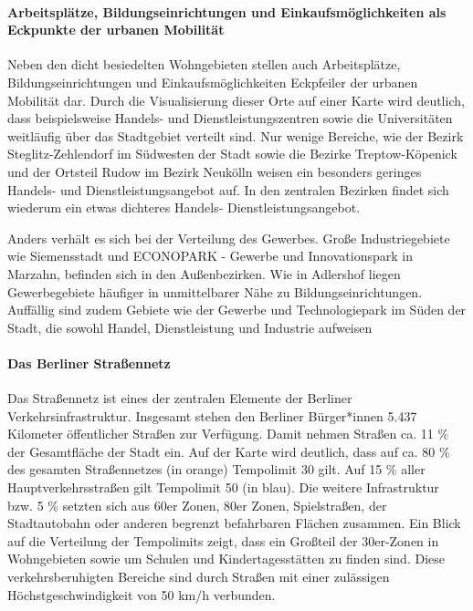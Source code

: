 \paragraph{Arbeitsplätze, Bildungseinrichtungen und Einkaufsmöglichkeiten als Eckpunkte der urbanen Mobilität}

Neben den dicht besiedelten Wohngebieten stellen auch Arbeitsplätze, Bildungseinrichtungen und Einkaufsmöglichkeiten Eckpfeiler der urbanen Mobilität dar. Durch die Visualisierung dieser Orte auf einer Karte wird deutlich, dass beispielsweise Handels- und Dienstleistungszentren sowie die Universitäten weitläufig über das Stadtgebiet verteilt sind. Nur wenige Bereiche, wie der Bezirk Steglitz-Zehlendorf im Südwesten der Stadt sowie die Bezirke Treptow-Köpenick und der Ortsteil Rudow im Bezirk Neukölln weisen ein besonders geringes Handels- und Dienstleistungsangebot auf. In den zentralen Bezirken findet sich wiederum ein etwas dichteres Handels- Dienstleistungsangebot.

Anders verhält es sich bei der Verteilung des Gewerbes. Große Industriegebiete wie Siemensstadt und ECONOPARK - Gewerbe und Innovationspark in Marzahn, befinden sich in den Außenbezirken. Wie in Adlershof liegen Gewerbegebiete häufiger in unmittelbarer Nähe zu Bildungseinrichtungen. Auffällig sind zudem Gebiete wie der Gewerbe und Technologiepark im Süden der Stadt, die sowohl Handel, Dienstleistung und Industrie aufweisen


\paragraph{Das Berliner Straßennetz}

Das Straßennetz ist eines der zentralen Elemente der Berliner Verkehrsinfrastruktur. Insgesamt stehen den Berliner Bürger*innen 5.437 Kilometer öffentlicher Straßen zur Verfügung. Damit nehmen Straßen ca. 11 \% der Gesamtfläche der Stadt ein. Auf der Karte wird deutlich, dass auf ca. 80 \% des gesamten Straßennetzes (in orange) Tempolimit 30 gilt. Auf 15 \% aller Hauptverkehrsstraßen gilt Tempolimit 50 (in blau). Die weitere Infrastruktur bzw. 5 \% setzten sich aus 60er Zonen, 80er Zonen, Spielstraßen, der Stadtautobahn oder anderen begrenzt befahrbaren Flächen zusammen. Ein Blick auf die Verteilung der Tempolimits zeigt, dass ein Großteil der 30er-Zonen in Wohngebieten sowie um Schulen und Kindertagesstätten zu finden sind. Diese verkehrsberuhigten Bereiche sind durch Straßen mit einer zulässigen Höchstgeschwindigkeit von 50 km/h verbunden.

